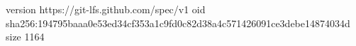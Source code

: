 version https://git-lfs.github.com/spec/v1
oid sha256:194795baaa0e53ed34cf353a1c9fd0c82d38a4c571426091ce3debe14874034d
size 1164
